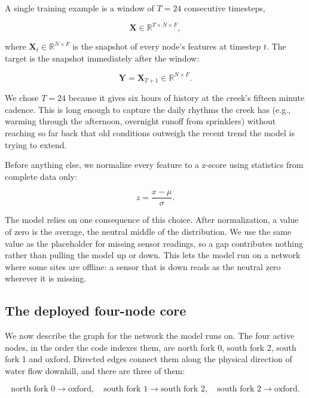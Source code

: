 \documentclass{article}
\begin{document}
A single training example is a window of $T = 24$ consecutive timesteps,

\begin{equation}
  \label{eq:window}
  \mathbf{X} \in \mathbb{R}^{T \times N \times F},
\end{equation}

where $\mathbf{X}_t \in \mathbb{R}^{N \times F}$ is the snapshot of every node's
features at timestep $t$. The target is the snapshot immediately after the
window:

\begin{equation}
  \label{eq:target}
  \mathbf{Y} = \mathbf{X}_{T+1} \in \mathbb{R}^{N \times F}.
\end{equation}

We chose $T = 24$ because it gives six hours of history at the creek's
fifteen minute cadence. This is long enough to capture the daily rhythms the
creek has (e.g., warming through the afternoon, overnight runoff from
sprinklers) without reaching so far back that old conditions outweigh the
recent trend the model is trying to extend.

Before anything else, we normalize every feature to a z-score using statistics
from complete data only:

\begin{equation}
  \label{eq:zscore}
  z = \frac{x - \mu}{\sigma}.
\end{equation}

The model relies on one consequence of this choice. After normalization, a
value of zero is the average, the neutral middle of the distribution. We use
the same value as the placeholder for missing sensor readings, so a gap
contributes nothing rather than pulling the model up or down. This lets the
model run on a network where some sites are offline: a sensor that is down
reads as the neutral zero wherever it is missing.

\subsection{The deployed four-node core}
\label{sec:graph}

We now describe the graph for the network the model runs on. The four active
nodes, in the order the code indexes them, are north fork 0, south fork 2,
south fork 1 and oxford. Directed edges connect them along the physical
direction of water flow downhill, and there are three of them:

\begin{equation}
  \label{eq:edges}
  \text{north fork 0} \rightarrow \text{oxford}, \quad
  \text{south fork 1} \rightarrow \text{south fork 2}, \quad
  \text{south fork 2} \rightarrow \text{oxford}.
\end{equation}
\end{document}
